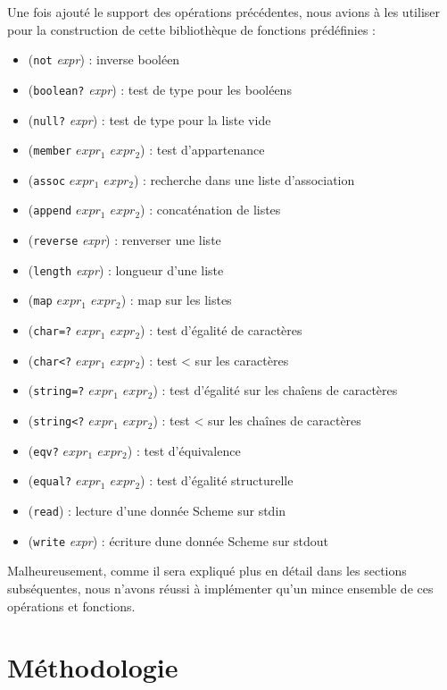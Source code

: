 \documentclass[12pt]{article}
\begin{document}
Une fois ajouté le support des opérations précédentes, nous avions à les utiliser pour la construction de cette bibliothèque de fonctions prédéfinies :

\begin{itemize}
\item (\texttt{not} \textit{expr}) : inverse booléen
\item (\texttt{boolean?} \textit{expr}) : test de type pour les booléens
\item (\texttt{null?} \textit{expr}) : test de type pour la liste vide
\item (\texttt{member} \textit{$expr_1$ $expr_2$}) : test d'appartenance
\item (\texttt{assoc} \textit{$expr_1$ $expr_2$}) : recherche dans une liste d'association
\item (\texttt{append} \textit{$expr_1$ $expr_2$}) : concaténation de listes
\item (\texttt{reverse} \textit{expr}) : renverser une liste
\item (\texttt{length} \textit{expr}) : longueur d'une liste
\item (\texttt{map} \textit{$expr_1$ $expr_2$}) : map sur les listes
\item (\texttt{char=?} \textit{$expr_1$ $expr_2$}) : test d'égalité de caractères
\item (\texttt{char<?} \textit{$expr_1$ $expr_2$}) : test < sur les caractères
\item (\texttt{string=?} \textit{$expr_1$ $expr_2$}) : test d'égalité sur les chaîens de caractères
\item (\texttt{string<?} \textit{$expr_1$ $expr_2$}) : test < sur les chaînes de caractères
\item (\texttt{eqv?} \textit{$expr_1$ $expr_2$}) : test d'équivalence
\item (\texttt{equal?} \textit{$expr_1$ $expr_2$}) : test d'égalité structurelle
\item (\texttt{read}) : lecture d'une donnée Scheme sur stdin
\item (\texttt{write} \textit{expr}) : écriture dune donnée Scheme sur stdout
\end{itemize}

Malheureusement, comme il sera expliqué plus en détail dans les sections subséquentes, nous n'avons réussi à implémenter qu'un mince ensemble de ces opérations et fonctions.

\section{Méthodologie}
\end{document}
